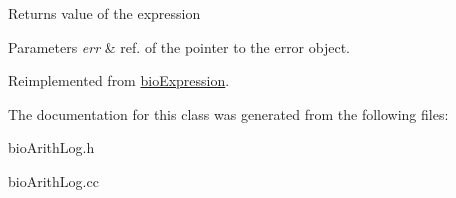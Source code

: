 \begin{DoxyReturn}{Returns}
value of the expression 
\end{DoxyReturn}

\begin{DoxyParams}{Parameters}
{\em err} & ref. of the pointer to the error object. \\
\hline
\end{DoxyParams}


Reimplemented from \hyperlink{classbio_expression_af58662a5d4d456f15bc4f2c9bd4f8a5b}{bio\+Expression}.



The documentation for this class was generated from the following files\+:\begin{DoxyCompactItemize}
\item 
bio\+Arith\+Log.\+h\item 
bio\+Arith\+Log.\+cc\end{DoxyCompactItemize}

